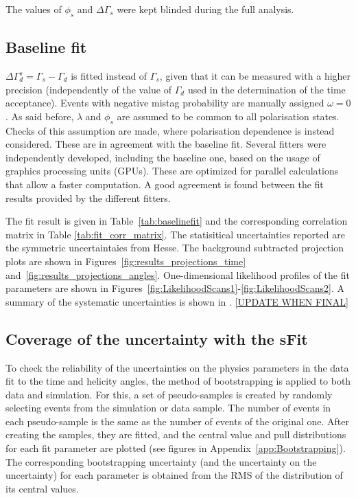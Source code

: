 The values of $\phi_s$ and $\Delta \Gamma_s$ were kept blinded during the full analysis.%

\subsection{Baseline fit}
$\Delta\Gamma_d^s = \Gamma_s - \Gamma_d$ is fitted instead of $\Gamma_s$, given that it can be measured with a higher precision (independently of the value of $\Gamma_d$ used in the determination of the time acceptance). Events with negative mistag probability are manually assigned $\omega = 0$.
As said before, $\lambda$ and $\phi_s$ are assumed to be common to all polarisation states.  Checks of this assumption are made, where polarisation dependence is instead considered. These are in agreement with the baseline fit. 
Several fitters were independently developed, including the baseline one, based on the usage of graphics processing units (GPUs). These are optimized for parallel calculations that allow a faster computation. A good agreement is found between the fit results provided by the different fitters. 

The fit result is given in Table~\ref{tab:baselinefit} and the corresponding
correlation matrix in Table \ref{tab:fit_corr_matrix}.
The statisitical uncertainties reported are the symmetric uncertaintaies from Hesse. The background subtracted projection plots are shown in
Figures~\ref{fig:results_projections_time} and~\ref{fig:results_projections_angles}. 
One-dimensional likelihood profiles of the fit parameters are shown in Figures~\ref{fig:LikelihoodScans1}-\ref{fig:LikelihoodScans2}.  A summary of the systematic uncertainties is shown in . \ref{UPDATE WHEN FINAL}

\subsection{Coverage of the uncertainty with the sFit}

To check the reliability of the uncertainties on the physics parameters in the data fit to the time and helicity angles, the method of bootstrapping is applied to both data and simulation. For this, a set of pseudo-samples is created by randomly selecting events from the simulation or data sample. The number of events in each pseudo-sample is the same as the number of events of the original one. 
After creating the samples, they are fitted, and the central value and pull distributions for each fit parameter are plotted (see figures in Appendix~\ref{app:Bootstrapping}). The corresponding  bootstrapping uncertainty (and the uncertainty on the uncertainty) for each parameter is obtained from the RMS of the distribution of its central values.

